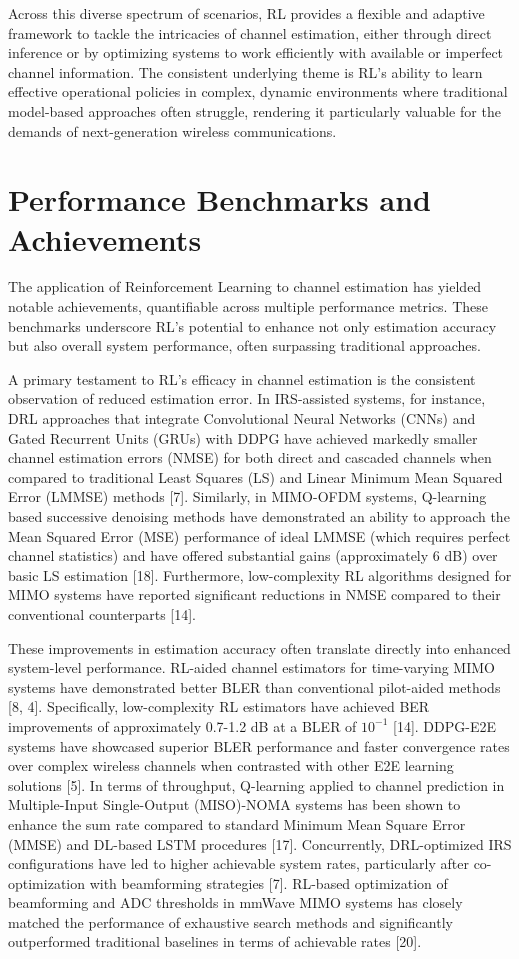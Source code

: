 \documentclass[journal,twocolumn]{IEEEtran}
\begin{document}
Across this diverse spectrum of scenarios, RL provides a flexible and adaptive framework to tackle the intricacies of channel estimation, either through direct inference or by optimizing systems to work efficiently with available or imperfect channel information. The consistent underlying theme is RL's ability to learn effective operational policies in complex, dynamic environments where traditional model-based approaches often struggle, rendering it particularly valuable for the demands of next-generation wireless communications.

\section{Performance Benchmarks and Achievements}

The application of Reinforcement Learning to channel estimation has yielded notable achievements, quantifiable across multiple performance metrics. These benchmarks underscore RL's potential to enhance not only estimation accuracy but also overall system performance, often surpassing traditional approaches.

A primary testament to RL's efficacy in channel estimation is the consistent observation of reduced estimation error. In IRS-assisted systems, for instance, DRL approaches that integrate Convolutional Neural Networks (CNNs) and Gated Recurrent Units (GRUs) with DDPG have achieved markedly smaller channel estimation errors (NMSE) for both direct and cascaded channels when compared to traditional Least Squares (LS) and Linear Minimum Mean Squared Error (LMMSE) methods [7]. Similarly, in MIMO-OFDM systems, Q-learning based successive denoising methods have demonstrated an ability to approach the Mean Squared Error (MSE) performance of ideal LMMSE (which requires perfect channel statistics) and have offered substantial gains (approximately 6 dB) over basic LS estimation [18]. Furthermore, low-complexity RL algorithms designed for MIMO systems have reported significant reductions in NMSE compared to their conventional counterparts [14].

These improvements in estimation accuracy often translate directly into enhanced system-level performance. RL-aided channel estimators for time-varying MIMO systems have demonstrated better BLER than conventional pilot-aided methods [8, 4]. Specifically, low-complexity RL estimators have achieved BER improvements of approximately 0.7-1.2 dB at a BLER of $10^{-1}$ [14]. DDPG-E2E systems have showcased superior BLER performance and faster convergence rates over complex wireless channels when contrasted with other E2E learning solutions [5]. In terms of throughput, Q-learning applied to channel prediction in Multiple-Input Single-Output (MISO)-NOMA systems has been shown to enhance the sum rate compared to standard Minimum Mean Square Error (MMSE) and DL-based LSTM procedures [17]. Concurrently, DRL-optimized IRS configurations have led to higher achievable system rates, particularly after co-optimization with beamforming strategies [7]. RL-based optimization of beamforming and ADC thresholds in mmWave MIMO systems has closely matched the performance of exhaustive search methods and significantly outperformed traditional baselines in terms of achievable rates [20].
\end{document}
